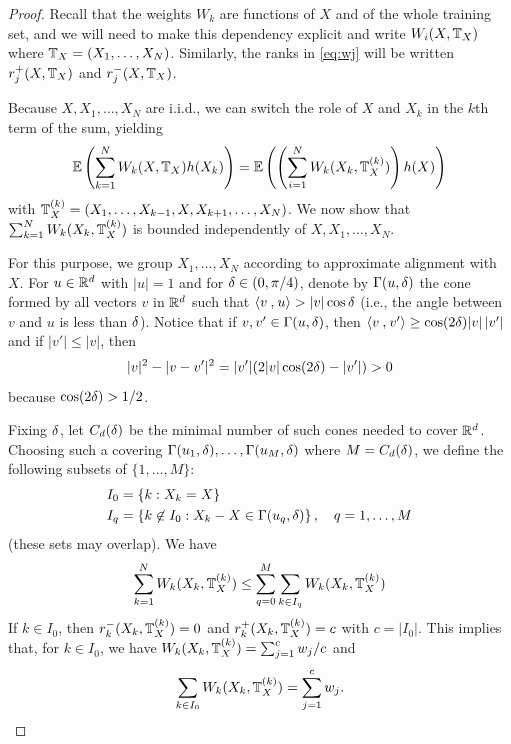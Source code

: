 \begin{proof}
Recall that the weights $W_k$ are functions of $X$ and of the whole training set, and we will need to make this dependency explicit and
write $W_i(X, {\mathbb T}_X)$ where ${\mathbb T}_X = (X_1, \ldots, X_N)$. Similarly, the ranks in \eqref{eq:wj} will be written $r^+_j(X, {\mathbb T}_X)$ and $r^-_j(X, {\mathbb T}_X)$.

Because $X, X_1, \ldots, X_N$ are i.i.d., we can switch the role of $X$ and $X_k$ in the $k$th term of the sum, yielding
\[
\bm{\mathbb E}\left(\sum_{k=1}^N W_{k}(X, {\mathbb T}_X) h(X_k)\right) = \bm{\mathbb E}\left(\left(\sum_{i=1}^N W_{k}(X_k, {\mathbb T}_X^{(k)})\right) h(X)\right)
\]
with ${\mathbb T}_X^{(k)} = (X_1, \ldots, X_{k-1}, X, X_{k+1}, \ldots, X_N)$. We now show that 
$\sum_{k=1}^N W_{k}(X_k, {\mathbb T}_X^{(k)})$ is bounded independently of $X, X_1, \ldots, X_N$. 

For this purpose, we group $X_1, \ldots, X_N$ according to approximate alignment with $X$. For $u\in{\mathbb{R}}^d$ with $|u|=1$ and for $\delta \in (0, \pi/4)$, denote by $\Gamma(u, \delta)$ the cone formed by all vectors $v$ in ${\mathbb{R}}^d$ such that ${\langle {v}\mathbin{,} {u}\rangle} > |v|\cos\delta $ (i.e., the angle between $v$ and $u$ is less than $\delta$).  Notice that if $v, v'\in \Gamma(u, \delta)$, then ${\langle {v}\mathbin{,} {v'}\rangle} \geq \cos(2\delta) |v|\,|v'|$ and if $|v'| \leq |v|$, then
\begin{equation}
\label{eq:nn.ineq}
|v|^2 - |v-v'|^2   = |v'|(2|v|\cos(2\delta) - |v'|) > 0
\end{equation}
because $\cos(2\delta) > 1/2$.


Fixing $\delta$, let $C_d(\delta)$ be the minimal number of such cones needed to cover ${\mathbb{R}}^d$. Choosing such a covering $\Gamma(u_1, \delta), \ldots, \Gamma(u_M, \delta)$ where $M = C_d(\delta)$, we define the following subsets of $\{1, \ldots, M\}$:
\begin{align*}
I_0 &= \left\{ k: X_k = X \right\}\\
I_q &= \left\{ k\not \in I_0: X_k-X\in \Gamma(u_q, \delta) \right\},\quad q=1, \ldots, M
\end{align*}
(these sets may overlap). We have
\[
\sum_{k=1}^N W_{k}(X_k, {\mathbb T}_X^{(k)}) \leq \sum_{q=0}^M \sum_{k\in I_q} W_{k}(X_k, {\mathbb T}_X^{(k)})
\]
If $k\in I_0$, then $r^-_k(X_k, {\mathbb T}_X^{(k)}) = 0$ and $r^+_k(X_k, {\mathbb T}_X^{(k)}) = c$ with $c = |I_0|$. This implies that, for $k\in I_0$, we have
$W_{k}(X_k, {\mathbb T}_X^{(k)}) = \sum_{j=1}^c w_j/c$ and 
\[
\sum_{k\in I_0} W_{k}(X_k, {\mathbb T}_X^{(k)}) = \sum_{j=1}^c w_j.
\]


\end{proof}
